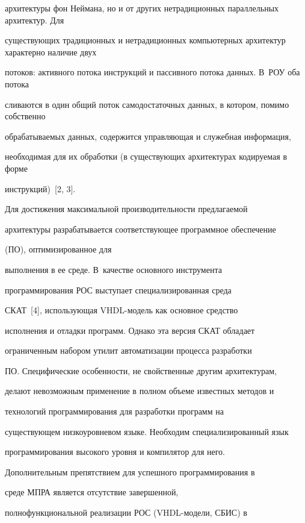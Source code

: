 архитектуры фон Неймана, но и от других нетрадиционных параллельных архитектур. Для 


существующих традиционных и нетрадиционных компьютерных архитектур характерно наличие двух 


потоков: активного потока инструкций и пассивного потока данных. В~РОУ оба потока 


сливаются в один общий поток самодостаточных данных, в котором, помимо собственно 


обрабатываемых данных, содержится управляющая и служебная информация, 


необходимая для их обработки (в существующих архитектурах кодируемая в форме 


инструкций)~[2, 3].


   


   Для достижения максимальной производительности предлагаемой 


архитектуры разрабатывается соответствующее программное обеспечение


(ПО), оптимизированное для 


выполнения в ее среде. В~качестве основного инструмента 


программирования РОС выступает специализированная среда 


СКАТ~[4], использующая VHDL-мо\-дель как основное средство 


исполнения и отладки программ. Однако эта версия СКАТ обладает 


ограниченным набором утилит автоматизации процесса разработки 


ПО. Специфические особенности, не свойственные другим архитектурам, 


делают невозможным применение в полном объеме известных методов и 


технологий программирования для разработки программ на 


существующем низкоуровневом языке. Необходим специализированный язык 


программирования высокого уровня и компилятор для него. 


   


   Дополнительным препятствием для успешного программирования в 


среде  МПРА является отсутствие завершенной, 


полнофункциональной реализации РОС  (VHDL-мо\-де\-ли, СБИС) в 


